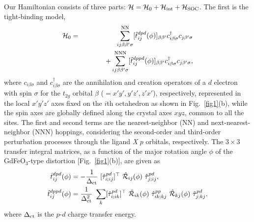 \documentclass[aps,twocolumn,prb,preprintnumbers,amsmath,amssymb]{revtex4-2}
\begin{document}
Our Hamiltonian consists of three parts: 
 ${\cal H} = {\cal H}_{\rm 0} + {\cal H}_{\rm int} + {\cal H}_{\rm SOC}$. 
The first is the tight-binding model, 
\begin{eqnarray} 
{\cal H}_{\rm 0} &=& 
 \sum_{ij \beta \beta' \sigma}^\textrm{NN} [\hat{t}^{dpd}_{ij}(\phi)]_{\beta \beta'} c^{\dagger}_{i \beta \sigma} c_{j \beta' \sigma} \notag \\ 
 &\ & \hspace{3em} + \sum_{ij \beta \beta' \sigma}^\textrm{NNN} [\hat{t}^{dppd}_{ij}(\phi)]_{\beta \beta'} c^{\dagger}_{i \beta \sigma} c_{j \beta' \sigma}, \label{TB}
\end{eqnarray}
where $c_{i \beta \sigma}$ and $c^{\dagger}_{i \beta \sigma}$ are  
 the annihilation and creation operators of a $d$ electron with spin $\sigma$ 
 for the $t_{2g}$ orbital $\beta$ ($=x'y', y'z', z'x'$), respectively, 
 represented in the local $x'y'z'$ axes fixed on the $i$th octahedron as shown in Fig.~\ref{fig1}(b), 
 while the spin axes are globally defined along the crystal axes $xyz$, common to all the sites.
The first and second terms are the nearest-neighbor (NN) and next-nearest-neighbor (NNN) hoppings, 
 considering the second-order and third-order perturbation processes through the ligand {\it X} $p$ orbitals, 
 respectively. 
The $3\times3$ transfer integral matrices, 
 as a function of the major rotation angle $\phi$ of the GdFeO$_3$-type distortion [Fig.~\ref{fig1}(b)], 
 are given as 
\begin{align}
\hat{t}^{dpd}_{ij}(\phi) &= - \frac{1}{\Delta_\textrm{ct}} \ [\hat{\tau}^{pd}_{i;ij}]^\top \  \hat{\cal R}_{ij}(\phi) \ \hat{\tau}^{pd}_{j;ij}, \notag\\
\hat{t}^{dppd}_{ij}(\phi) &= \frac{1}{\Delta_\textrm{ct}^2}\ \sum_k [\hat{\tau}^{pd}_{i;ik}]^\top \  \hat{\cal R}_{ik}(\phi) 
 \ \hat{\tau}^{pp}_{ik;kj} \ \hat{\cal R}_{kj}(\phi) \ \hat{\tau}^{pd}_{j;kj}, \label{hopping}
\end{align}
where $\Delta_{\rm ct}$ is the $p$-$d$ charge transfer energy. 
\end{document}
